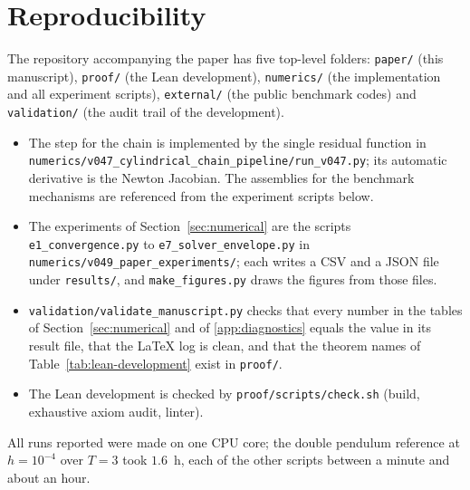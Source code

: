 \documentclass[preprint,12pt]{elsarticle}
\begin{document}
\section{Reproducibility}
\label{app:repro}

The repository accompanying the paper has five top-level folders: \texttt{paper/} (this
manuscript), \texttt{proof/} (the Lean development), \texttt{numerics/} (the implementation and all
experiment scripts), \texttt{external/} (the public benchmark codes) and \texttt{validation/} (the
audit trail of the development).
\begin{itemize}
  \item The step for the chain is implemented by the single residual function in
  \texttt{numerics/v047\_cylindrical\_chain\_pipeline/run\_v047.py}; its automatic derivative is the
  Newton Jacobian. The assemblies for the benchmark mechanisms are referenced from the experiment
  scripts below.
  \item The experiments of Section~\ref{sec:numerical} are the scripts \texttt{e1\_convergence.py}
  to \texttt{e7\_solver\_envelope.py} in \texttt{numerics/v049\_paper\_experiments/}; each writes a
  CSV and a JSON file under \texttt{results/}, and \texttt{make\_figures.py} draws the figures from
  those files.
  \item \texttt{validation/validate\_manuscript.py} checks that every number in the tables of
  Section~\ref{sec:numerical} and of \ref{app:diagnostics} equals the value in its result file, that
  the LaTeX log is clean, and that the theorem names of Table~\ref{tab:lean-development} exist in
  \texttt{proof/}.
  \item The Lean development is checked by \texttt{proof/scripts/check.sh} (build, exhaustive axiom
  audit, linter).
\end{itemize}
All runs reported were made on one CPU core; the double pendulum reference at $h=10^{-4}$ over
$T=3$ took $1.6$~h, each of the other scripts between a minute and about an hour.
\end{document}
